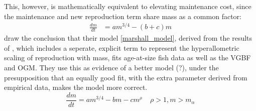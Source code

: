 \documentclass[a4paper]{article} %
\begin{document}
        This, however, is mathematically equivalent to elevating maintenance cost, since the maintenance and new reproduction term share mass as a common factor:
        \begin{align*}
            \frac{dm}{dt} &= am^{3/4} - (b+c)m
        \end{align*}
        \cite{Marshall2019b} draw the conclusion that their model \eqref{marshall_model}, derived from the results of \cite{Barneche2018d}, which includes a seperate, explicit term to represent the hyperallometric scaling of reproduction with mass, fits age-at-size fish data as well as the VGBF and \cite{West2001} OGM. They use this as evidence of a better model (?), under the presupposition that an equally good fit, with the extra parameter derived from empirical data, makes the model more correct. 
            \begin{equation}
                \frac{dm}{dt} = am^{3/4} - bm - cm^{\rho} \ \ \ \ \ \rho > 1, m > m_{\alpha} \label{marshall_model}
            \end{equation}        
\end{document}
